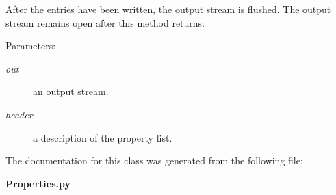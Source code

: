 After the entries have been written, the output stream is flushed. The output stream remains open after this method returns.

\begin{Desc}
\item[Parameters:]
\begin{description}
\item[{\em out}]an output stream. \item[{\em header}]a description of the property list.\end{description}
\end{Desc}


The documentation for this class was generated from the following file:\begin{CompactItemize}
\item 
{\bf Properties.py}\end{CompactItemize}
